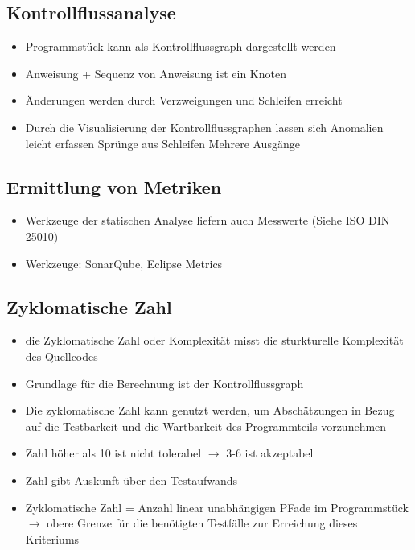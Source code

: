 \documentclass{report}
\theoremstyle{definition}
\theoremstyle{example}
\begin{document}
\subsection{Kontrollflussanalyse}
\begin{itemize}
   \item Programmstück kann als Kontrollflussgraph dargestellt werden
   \item Anweisung + Sequenz von Anweisung ist ein Knoten
   \item Änderungen werden durch Verzweigungen und Schleifen erreicht
   \item Durch die Visualisierung der Kontrollflussgraphen lassen sich Anomalien leicht erfassen
   \subitem Sprünge aus Schleifen
   \subitem Mehrere Ausgänge
\end{itemize}

\subsection{Ermittlung von Metriken}
\begin{itemize}
   \item Werkzeuge der statischen Analyse liefern auch Messwerte (Siehe ISO DIN 25010)
   \item Werkzeuge: SonarQube, Eclipse Metrics
\end{itemize}

\subsection{Zyklomatische Zahl}
\begin{itemize}
   \item die Zyklomatische Zahl oder Komplexität misst die sturkturelle Komplexität des Quellcodes
   \item Grundlage für die Berechnung ist der Kontrollflussgraph
   \item Die zyklomatische Zahl kann genutzt werden, um Abschätzungen in Bezug auf die Testbarkeit und die Wartbarkeit des Programmteils vorzunehmen
   \item Zahl höher als 10 ist nicht tolerabel $\rightarrow$ 3-6 ist akzeptabel
   \item Zahl gibt Auskunft über den Testaufwands
   \item Zyklomatische Zahl = Anzahl linear unabhängigen PFade im Programmstück $\rightarrow$ obere Grenze für die benötigten Testfälle zur Erreichung dieses Kriteriums
\end{itemize}
\end{document}
